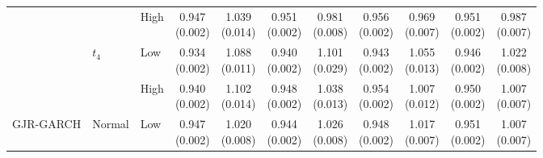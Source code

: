 \begin{table}[!t]
\begin{tabular}{lllcccccccc}
 &  & High & \shortstack{0.947\\[-1pt]\scriptsize(0.002)} & \shortstack{1.039\\[-1pt]\scriptsize(0.014)} & \shortstack{0.951\\[-1pt]\scriptsize(0.002)} & \shortstack{0.981\\[-1pt]\scriptsize(0.008)} & \shortstack{0.956\\[-1pt]\scriptsize(0.002)} & \shortstack{0.969\\[-1pt]\scriptsize(0.007)} & \shortstack{0.951\\[-1pt]\scriptsize(0.002)} & \shortstack{0.987\\[-1pt]\scriptsize(0.007)}\\
\addlinespace[1pt]
 & $t_4$ & Low & \shortstack{0.934\\[-1pt]\scriptsize(0.002)} & \shortstack{1.088\\[-1pt]\scriptsize(0.011)} & \shortstack{0.940\\[-1pt]\scriptsize(0.002)} & \shortstack{1.101\\[-1pt]\scriptsize(0.029)} & \shortstack{0.943\\[-1pt]\scriptsize(0.002)} & \shortstack{1.055\\[-1pt]\scriptsize(0.013)} & \shortstack{0.946\\[-1pt]\scriptsize(0.002)} & \shortstack{1.022\\[-1pt]\scriptsize(0.008)}\\
 &  & High & \shortstack{0.940\\[-1pt]\scriptsize(0.002)} & \shortstack{1.102\\[-1pt]\scriptsize(0.014)} & \shortstack{0.948\\[-1pt]\scriptsize(0.002)} & \shortstack{1.038\\[-1pt]\scriptsize(0.013)} & \shortstack{0.954\\[-1pt]\scriptsize(0.002)} & \shortstack{1.007\\[-1pt]\scriptsize(0.012)} & \shortstack{0.950\\[-1pt]\scriptsize(0.002)} & \shortstack{1.007\\[-1pt]\scriptsize(0.007)}\\
\addlinespace[1pt]
\midrule
GJR-GARCH & Normal & Low & \shortstack{0.947\\[-1pt]\scriptsize(0.002)} & \shortstack{1.020\\[-1pt]\scriptsize(0.008)} & \shortstack{0.944\\[-1pt]\scriptsize(0.002)} & \shortstack{1.026\\[-1pt]\scriptsize(0.008)} & \shortstack{0.948\\[-1pt]\scriptsize(0.002)} & \shortstack{1.017\\[-1pt]\scriptsize(0.007)} & \shortstack{0.951\\[-1pt]\scriptsize(0.002)} & \shortstack{1.007\\[-1pt]\scriptsize(0.007)}\\

\end{tabular}
\end{table}
